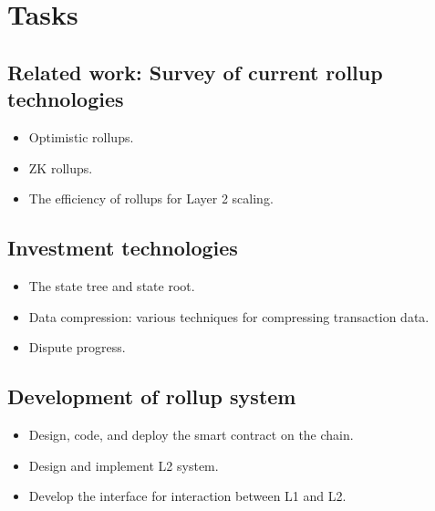 \documentclass{article}
\begin{document}


\section{Tasks}
\subsection{Related work: Survey of current rollup technologies}
\begin{itemize} 
\item Optimistic rollups. 
\item ZK rollups. 
\item The efficiency of rollups for Layer 2 scaling.
\end{itemize}
\subsection{Investment technologies}
\begin{itemize} 
\item The state tree and state root. 
\item Data compression: various techniques for compressing transaction data. 
\item Dispute progress.
\end{itemize}
\subsection{Development of rollup system}
\begin{itemize} 
\item Design, code, and deploy the smart contract on the chain. 
\item Design and implement L2 system. 
\item Develop the interface for interaction between L1 and L2.
\end{itemize}
\end{document}

